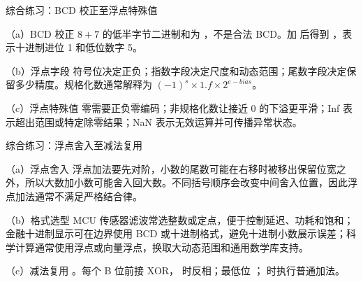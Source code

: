 \begin{chapteranswer}{综合练习：BCD 校正至浮点特殊值}
\begin{answersubproblem}{（a）BCD 校正}
$8+7$ 的低半字节二进制和为 ，不是合法 BCD。加  后得到 ，表示十进制进位 1 和低位数字 5。
\end{answersubproblem}
\begin{answersubproblem}{（b）浮点字段}
符号位决定正负；指数字段决定尺度和动态范围；尾数字段决定保留多少精度。规格化数通常解释为 $(-1)^s \times 1.f \times 2^{e-bias}$。
\end{answersubproblem}
\begin{answersubproblem}{（c）浮点特殊值}
零需要正负零编码；非规格化数让接近 0 的下溢更平滑；Inf 表示超出范围或特定除零结果；NaN 表示无效运算并可传播异常状态。
\end{answersubproblem}
\end{chapteranswer}

\begin{chapteranswer}{综合练习：浮点舍入至减法复用}
\begin{answersubproblem}{（a）浮点舍入}
浮点加法要先对阶，小数的尾数可能在右移时被移出保留位宽之外，所以大数加小数可能舍入回大数。不同括号顺序会改变中间舍入位置，因此浮点加法通常不满足严格结合律。
\end{answersubproblem}
\begin{answersubproblem}{（b）格式选型}
MCU 传感器滤波常选整数或定点，便于控制延迟、功耗和饱和；金融十进制显示可在边界使用 BCD 或十进制格式，避免十进制小数展示误差；科学计算通常使用浮点或向量浮点，换取大动态范围和通用数学库支持。
\end{answersubproblem}
\begin{answersubproblem}{（c）减法复用}
。每个 B 位前接 XOR， 时反相；最低位 ； 时执行普通加法。
\end{answersubproblem}
\end{chapteranswer}

